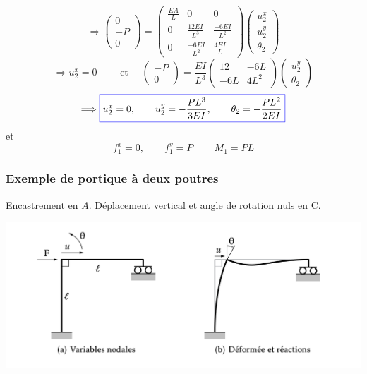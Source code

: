 \documentclass[a4paper]{article}
\newcommand{\myredbox}[1]{\fcolorbox{blue}{white}{$\displaystyle#1$}}
\begin{document}
 \[\Longrightarrow \left(\begin{array}{r} 
0\\-P\\0
\end{array}\right)=\left(\begin{array}{rrr} 

\frac{EA}{L}&0&0\\
0&\frac{12EI}{L^3}&\frac{-6EI}{L^2}\\
0&\frac{-6EI}{L^2}&\frac{4EI}{L}
\end{array}\right) \left(\begin{array}{l} 
u_{2}^x\\u_{2}^y\\\theta_2
\end{array}\right)
\]
\[\Longrightarrow u_{2}^x=0 \qquad\mbox{ et }\quad \left(\begin{array}{r} 
-P\\0
\end{array}\right)=\frac{EI}{L^3}\left(\begin{array}{rrr} 

12&-6L\\
-6L&4L^2
\end{array}\right) \left(\begin{array}{l} 
u_{2}^y\\\theta_2
\end{array}\right)
\]
 \[\Longrightarrow \myredbox{u_{2}^x=0, \qquad u_{2}^y=-\frac{PL^3}{3EI},\qquad \theta_{2}=-\frac{PL^2}{2EI}}\]
 et \[f_1^x=0,\qquad f_1^y=P\, \qquad M_1=PL\]
 
 \subsubsection*{Exemple de portique à deux poutres }
 Encastrement en $A$. Déplacement vertical et angle de rotation nuls en C.
 \begin{center}
 \includegraphics[scale=0.3]{portique.png}
 \end{center}
 
\end{document}
